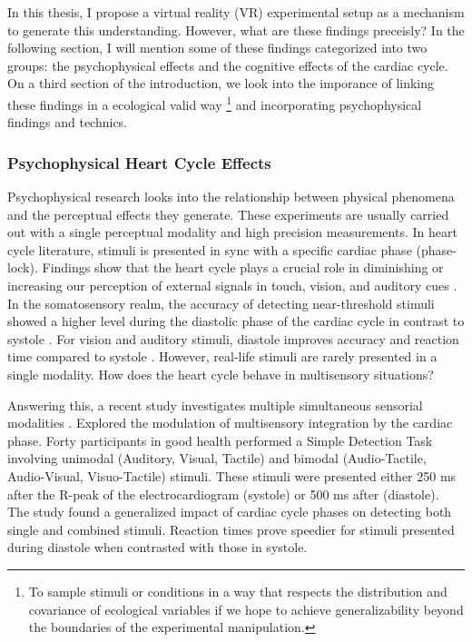 \documentclass[12pt,oneside,openright]{report}
\begin{document}
In this thesis, I propose a virtual reality (VR) experimental setup as a mechanism to generate this understanding. However, what are these findings preceisly? In the following section, I will mention some of these findings categorized into two groups: the psychophysical effects and the cognitive effects of the cardiac cycle. On a third section of the introduction, we look into the imporance of linking these findings in a ecological valid way \footnote{To sample stimuli or conditions in a way that respects the distribution and covariance of ecological variables if we hope to achieve generalizability beyond the boundaries of the experimental manipulation.} and incorporating psychophysical findings and technics.

\subsubsection*{Psychophysical Heart Cycle Effects}

Psychophysical research looks into the relationship between physical phenomena and the perceptual effects they generate. These experiments are usually carried out with a single perceptual modality and high precision measurements. In heart cycle literature, stimuli is presented in sync with a specific cardiac phase (phase-lock). Findings show that the heart cycle plays a crucial role in diminishing or increasing our perception of external signals in touch, vision, and auditory cues \parencite{SALTAFOSSI2023108642}. In the somatosensory realm, the accuracy of detecting near-threshold stimuli showed a higher level during the diastolic phase of the cardiac cycle in contrast to systole \parencite{esra_p, AL2021118247, Grund643, motyka}. For vision and auditory stimuli, diastole improves accuracy and reaction time compared to systole \parencite{SALTAFOSSI2023108642}. However, real-life stimuli are rarely presented in a single modality. How does the heart cycle behave in multisensory situations?

Answering this, a recent study investigates multiple simultaneous sensorial modalities \parencite{SALTAFOSSI2023108642}. Explored the modulation of multisensory integration by the cardiac phase. Forty participants in good health performed a Simple Detection Task involving unimodal (Auditory, Visual, Tactile) and bimodal (Audio-Tactile, Audio-Visual, Visuo-Tactile) stimuli. These stimuli were presented either 250 ms after the R-peak of the electrocardiogram (systole) or 500 ms after (diastole). The study found a generalized impact of cardiac cycle phases on detecting both single and combined stimuli. Reaction times prove speedier for stimuli presented during diastole when contrasted with those in systole.
\end{document}

